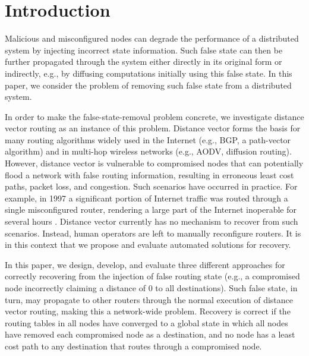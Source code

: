 
\section{Introduction}
\label{sec:intro}

\begin{framed}
\end{framed}

Malicious and misconfigured nodes can degrade the performance of a distributed system by injecting incorrect state information. Such false state can then be further propagated 
through the system either directly in its original form or indirectly, e.g., by diffusing computations initially using this false state.  In this paper, we consider 
the problem of removing such false state from a distributed system.

In order to make the false-state-removal problem concrete, we investigate distance vector routing as an instance of this problem. Distance vector forms the basis for many routing 
algorithms widely used in the Internet (e.g., BGP, a path-vector algorithm) and in multi-hop wireless networks (e.g., AODV, diffusion routing). However, distance vector is vulnerable 
to compromised nodes that can potentially flood a network with false routing information, resulting in erroneous least cost paths, packet loss, and congestion. Such scenarios have occurred in practice. 
For example, in 1997 a significant portion of Internet traffic was routed through a single misconfigured router, rendering a large part of the Internet inoperable for several hours \cite{Neumann97}. 
Distance vector currently has no mechanism to recover from such scenarios. Instead, human operators are left to manually reconfigure routers. It is in this context that we propose and
evaluate automated solutions for recovery.

In this paper, we design, develop, and evaluate three different approaches for correctly recovering from the injection of false routing state (e.g., a compromised node incorrectly
claiming a distance of $0$ to all destinations). Such false state, in turn, may propagate to other routers through the normal execution of distance vector routing, making this
a network-wide problem. Recovery is correct if the routing tables in all nodes have converged to a global state in which all nodes have removed each compromised node as a destination,
and no node has a least cost path to any destination that routes through a compromised node.

